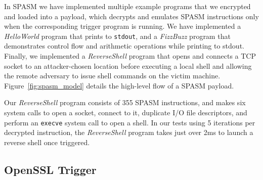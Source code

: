 In SPASM we have implemented multiple example programs that we encrypted and
loaded into a \speculake payload, which decrypts and emulates SPASM instructions
only when the corresponding trigger program is running. We have implemented a
\textit{HelloWorld} program that prints to \texttt{stdout}, and a
\textit{FizzBuzz} program that demonstrates control flow and arithmetic
operations while printing to stdout. Finally, we implemented a
\textit{ReverseShell} program that opens and connects a TCP socket to an
attacker-chosen location before executing a local shell and allowing the remote
adversary to issue shell commands on the victim machine.
Figure~\ref{fig:spasm_model} details the high-level flow of a SPASM payload.



Our \textit{ReverseShell} program consists of 355 SPASM instructions, and makes
six system calls to open a socket, connect to it, duplicate I/O file
descriptors, and perform an \texttt{execve} system call to open a shell. In our
tests using 5 iterations per decrypted instruction, the \textit{ReverseShell}
program takes just over 2ms to launch a reverse shell once triggered.


\FigSpasmModel

\subsection{OpenSSL Trigger}
\label{subsec:openssl-impl}


